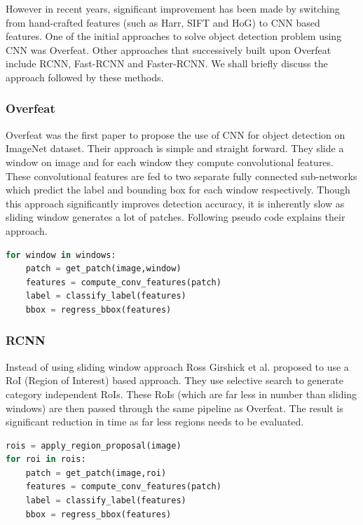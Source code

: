 However in recent years, significant improvement has been made by switching from hand-crafted features (such as Harr, SIFT and HoG) to CNN based features. One of the initial approaches to solve object detection problem using CNN was Overfeat\cite{sermanet2013overfeat}. Other approaches that successively built upon Overfeat include RCNN\cite{ref_rcnn}, Fast-RCNN\cite{ref_fastrcnn} and Faster-RCNN\cite{ren2015faster}. We shall briefly discuss the approach followed by these methods. 

\subsubsection{Overfeat}
Overfeat\cite{sermanet2013overfeat} was the first paper to propose the use of CNN for object detection on ImageNet\cite{ref_imagenet} dataset. Their approach is simple and straight forward. They slide a window on image and for each window they compute convolutional features. These convolutional features are fed to two separate fully connected sub-networks which predict the label and bounding box for each window respectively. Though this approach significantly improves detection accuracy, it is inherently slow as sliding window generates a lot of patches. Following pseudo code explains their approach.

\begin{lstlisting}[language=Python, caption=Overfeat pseudo code]
for window in windows:
    patch = get_patch(image,window)
    features = compute_conv_features(patch)
    label = classify_label(features)
    bbox = regress_bbox(features)
\end{lstlisting}

\subsubsection{RCNN}
Instead of using sliding window approach Ross Girshick et al.\cite{ref_rcnn} proposed to use a RoI (Region of Interest) based approach. They use selective search\cite{uijlings2013selective_search} to generate category independent RoIs. These RoIs (which are far less in number than sliding windows) are then passed through the same pipeline as Overfeat. The result is significant reduction in time as far less regions needs to be evaluated. 

\begin{lstlisting}[language=Python, caption=RCNN pseudo code]
rois = apply_region_proposal(image)
for roi in rois:
    patch = get_patch(image,roi)
    features = compute_conv_features(patch)
    label = classify_label(features)
    bbox = regress_bbox(features)
\end{lstlisting}

